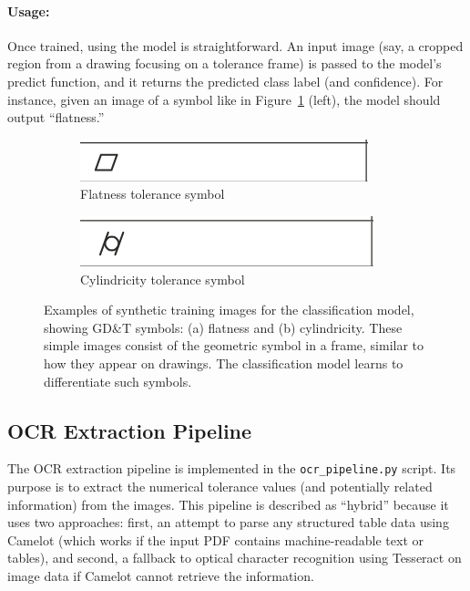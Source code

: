 \documentclass[11pt,a4paper]{article}
\begin{document}
\paragraph{Usage:} Once trained, using the model is straightforward. An input image (say, a cropped region from a drawing focusing on a tolerance frame) is passed to the model’s predict function, and it returns the predicted class label (and confidence). For instance, given an image of a symbol like in Figure~\ref{fig:synthetic_samples} (left), the model should output “flatness.” 

\begin{figure}[h!]
\centering
\begin{subfigure}{0.45\textwidth}
  \centering
  \includegraphics[width=\textwidth, trim=0 0 0 0, clip]{form_flatness.png}
  \caption{Flatness tolerance symbol}
\end{subfigure}\hfill
\begin{subfigure}{0.45\textwidth}
  \centering
  \includegraphics[width=\textwidth, trim=0 0 0 0, clip]{form_cylindricity.png}
  \caption{Cylindricity tolerance symbol}
\end{subfigure}
\caption{Examples of synthetic training images for the classification model, showing GD\&T symbols: (a) flatness and (b) cylindricity. These simple images consist of the geometric symbol in a frame, similar to how they appear on drawings. The classification model learns to differentiate such symbols.}
\label{fig:synthetic_samples}
\end{figure}

\subsection{OCR Extraction Pipeline}
The OCR extraction pipeline is implemented in the \verb|ocr_pipeline.py| script. Its purpose is to extract the numerical tolerance values (and potentially related information) from the images. This pipeline is described as “hybrid” because it uses two approaches: first, an attempt to parse any structured table data using Camelot (which works if the input PDF contains machine-readable text or tables), and second, a fallback to optical character recognition using Tesseract on image data if Camelot cannot retrieve the information.
\end{document}
